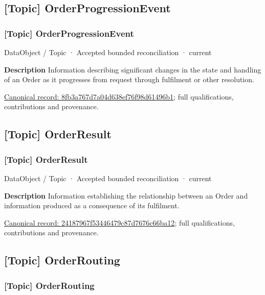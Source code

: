 \subsection{[Topic] OrderProgressionEvent}

\subsubsection{[Topic] OrderProgressionEvent}

\label{element:8fb3a767d7a04d638ef76f98d61496b1}
{\small DataObject / Topic · Accepted bounded reconciliation · current}\par

\textbf{Description}
Information describing significant changes in the state and handling of an Order as it progresses from request through fulfilment or other resolution.


{\footnotesize \href{../../../../continuum/application/data-object/topic/8fb3a767d7a04d638ef76f98d61496b1.md}{Canonical record: 8fb3a767d7a04d638ef76f98d61496b1}; full qualifications, contributions and provenance.}\par
\subsection{[Topic] OrderResult}

\subsubsection{[Topic] OrderResult}

\label{element:24187967f53446479c87d7676c66ba12}
{\small DataObject / Topic · Accepted bounded reconciliation · current}\par

\textbf{Description}
Information establishing the relationship between an Order and information produced as a consequence of its fulfilment.


{\footnotesize \href{../../../../continuum/application/data-object/topic/24187967f53446479c87d7676c66ba12.md}{Canonical record: 24187967f53446479c87d7676c66ba12}; full qualifications, contributions and provenance.}\par
\subsection{[Topic] OrderRouting}

\subsubsection{[Topic] OrderRouting}


